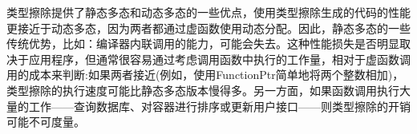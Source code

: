 类型擦除提供了静态多态和动态多态的一些优点，使用类型擦除生成的代码的性能更接近于动态多态，因为两者都通过虚函数使用动态分配。因此，静态多态的一些传统优势，比如：编译器内联调用的能力，可能会失去。这种性能损失是否明显取决于应用程序，但通常很容易通过考虑调用函数中执行的工作量，相对于虚函数调用的成本来判断:如果两者接近(例如，使用FunctionPtr简单地将两个整数相加)，类型擦除的执行速度可能比静态多态版本慢得多。另一方面，如果函数调用执行大量的工作——查询数据库、对容器进行排序或更新用户接口——则类型擦除的开销可能不可度量。